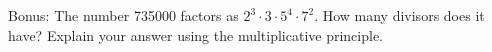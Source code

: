 \begin{questions}
\bonusquestion Bonus: The number 735000 factors as $2^3 \cdot 3 \cdot 5^4 \cdot 7^2$.  How many divisors does it have?  Explain your answer using the multiplicative principle.



%		
%
%





\end{questions}
